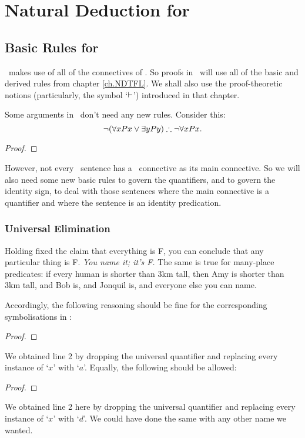 \part{Natural Deduction for \FOL}
\label{ch.NDFOL}

\chapter{Basic Rules for \textnormal{\FOL}}\label{s:BasicFOL}

\FOL\ makes use of all of the connectives of \TFL. So proofs in \FOL\ will use all of the basic and derived rules from chapter \ref{ch.NDTFL}. We shall also use the proof-theoretic notions (particularly, the symbol `$\vdash$') introduced in that chapter. 

Some arguments in \FOL\ don't need any new rules. Consider this: $$\neg(\forall x Px \vee \exists y Py) \mathrel{\therefore} \neg \forall x Px.$$ \begin{proof}
	\open
	\close
\end{proof}

However, not every \FOL\ sentence has a \TFL\ connective as its main connective. So we will also need some new basic rules to govern the quantifiers, and to govern the identity sign, to deal with those sentences where the main connective is a quantifier and where the sentence is an identity predication.


\section{Universal Elimination}\label{unielim}

Holding fixed the claim that everything is F, you can conclude that any particular thing is F. \emph{You name it; it's F.} The same is true for many-place predicates: if every human is shorter than 3km tall, then Amy is shorter than 3km tall, and Bob is, and Jonquil is,  and everyone else you can name.

Accordingly, the following reasoning should be fine for the corresponding symbolisations in \FOL:
\begin{proof}
	 
\end{proof}
We obtained line 2 by dropping the universal quantifier and replacing every instance of `$x$' with `$a$'. Equally, the following should be allowed:
\begin{proof}
	 
\end{proof}
We obtained line 2 here by dropping the universal quantifier and replacing every instance of `$x$' with `$d$'. We could have done the same with any other name we wanted. 

